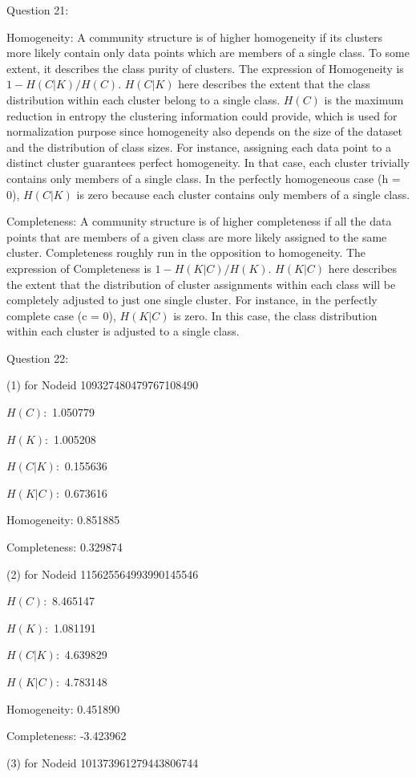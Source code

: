 \documentclass[11pt]{article}
\begin{document}
Question 21:

Homogeneity: A community structure is of higher homogeneity if its clusters more likely contain only data points which are members of a single class. To some extent, it describes the class purity of clusters. The expression of Homogeneity is $1 - H(C|K) / H(C)$. $H(C|K)$ here describes the extent that the class distribution within each cluster belong to a single class. $H(C)$ is the maximum reduction in entropy the clustering information could provide, which is used for normalization purpose since homogeneity also depends on the size of the dataset and the distribution of class sizes. For instance, assigning each data point to a distinct cluster guarantees perfect homogeneity. In that case, each cluster trivially contains only members of a single class. In the perfectly homogeneous case (h = 0), $H(C|K)$ is zero because each cluster contains only members of a single class.

Completeness: A community structure is of higher completeness if all the data points that are members of a given class are more likely assigned to the same cluster. Completeness roughly run in the opposition to homogeneity. The expression of Completeness is $1 - H(K|C) / H(K)$. $H(K|C)$ here describes the extent that the distribution of cluster assignments within each class will be completely adjusted to just one single cluster. For instance, in the perfectly complete case (c = 0), $H(K|C)$ is zero. In this case, the class distribution within each cluster is adjusted to a single class.


Question 22:

(1) for Nodeid 109327480479767108490 

$H(C):$ 1.050779

$H(K):$ 1.005208

$H(C | K):$ 0.155636

$H(K | C):$ 0.673616 

Homogeneity: 0.851885 

Completeness: 0.329874

(2) for Nodeid 115625564993990145546 

$H(C):$ 8.465147

$H(K):$ 1.081191

$H(C | K):$ 4.639829

$H(K | C):$ 4.783148 

Homogeneity: 0.451890 

Completeness: -3.423962

(3) for Nodeid 101373961279443806744 
\end{document}
